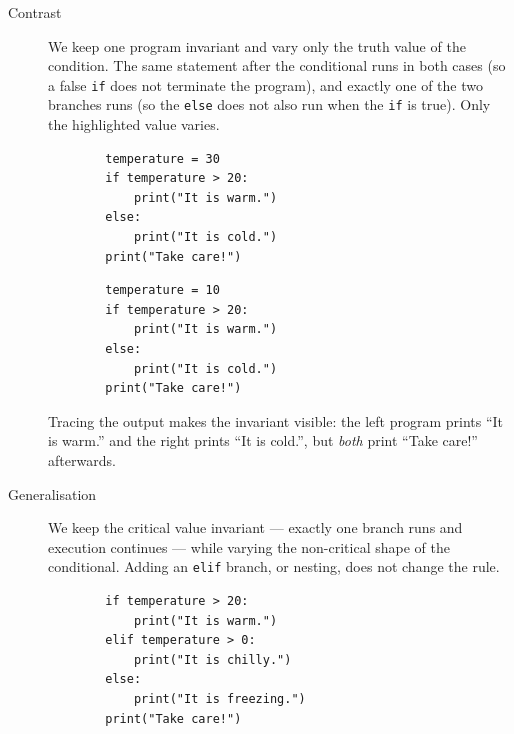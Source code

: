 \begin{description}
  \item[Contrast] We keep one program invariant and vary only the truth value of
    the condition. The same statement after the conditional runs in both cases
    (so a false \texttt{if} does not terminate the program), and
    exactly one of the two branches runs (so the \texttt{else} does
    not also run when the \texttt{if} is true). Only the
    highlighted value varies.

    \hfill
    \begin{minipage}[t]{0.45\columnwidth}
      \begin{verbatim}
        temperature = 30
        if temperature > 20:
            print("It is warm.")
        else:
            print("It is cold.")
        print("Take care!")
      \end{verbatim}
    \end{minipage}
    \hfill
    \begin{minipage}[t]{0.45\columnwidth}
      \begin{verbatim}
        temperature = 10
        if temperature > 20:
            print("It is warm.")
        else:
            print("It is cold.")
        print("Take care!")
      \end{verbatim}
    \end{minipage}
    \newline
    Tracing the output makes the invariant visible: the left program prints
    \enquote{It is warm.} and the right prints \enquote{It is cold.}, but
    \emph{both} print \enquote{Take care!} afterwards.

  \item[Generalisation] We keep the critical value invariant --- exactly one
    branch runs and execution continues --- while varying the non-critical
    shape of the conditional. Adding an \texttt{elif} branch, or
    nesting, does not change the rule.

    \hfill
    \begin{minipage}[t]{0.45\columnwidth}
      \begin{verbatim}
        if temperature > 20:
            print("It is warm.")
        elif temperature > 0:
            print("It is chilly.")
        else:
            print("It is freezing.")
        print("Take care!")
      \end{verbatim}
    \end{minipage}


\end{description}
